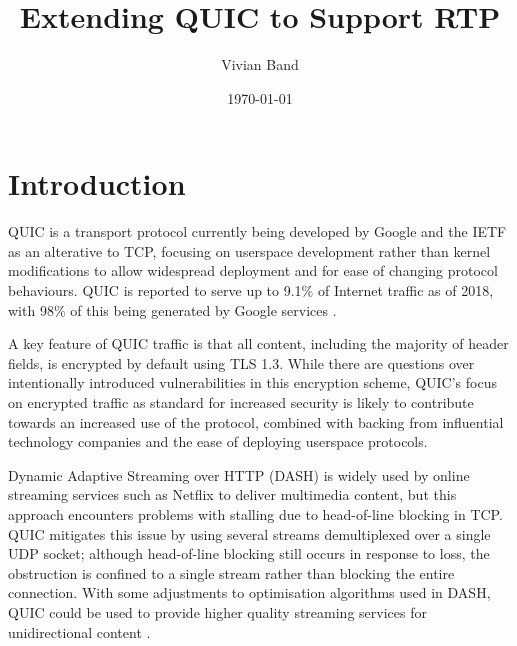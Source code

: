 \documentclass{mprop}
\begin{document}
\title{Extending QUIC to Support RTP}
\author{Vivian Band}
\date{\today}
\maketitle

\tableofcontents
\newpage

\section{Introduction}\label{intro}


QUIC is a transport protocol currently being developed by Google and the IETF as an alterative to TCP, focusing on userspace development rather than kernel modifications to allow widespread deployment and for ease of changing protocol behaviours. QUIC is reported to serve up to 9.1\% of Internet traffic as of 2018, with 98\% of this being generated by Google services \cite{Ruth2018}. 

A key feature of QUIC traffic is that all content, including the majority of header fields, is encrypted by default using TLS 1.3. While there are questions over intentionally introduced vulnerabilities in this encryption scheme, QUIC's focus on encrypted traffic as standard for increased security is likely to contribute towards an increased use of the protocol, combined with backing from influential technology companies and the ease of deploying userspace protocols.

Dynamic Adaptive Streaming over HTTP (DASH) is widely used by online streaming services such as Netflix to deliver multimedia content, but this approach encounters problems with stalling due to head-of-line blocking in TCP. QUIC mitigates this issue by using several streams demultiplexed over a single UDP socket; although head-of-line blocking still occurs in response to loss, the obstruction is confined to a single stream rather than blocking the entire connection. With some adjustments to optimisation algorithms used in DASH, QUIC could be used to provide higher quality streaming services for unidirectional content \cite{Bhat2017}.
\end{document}
